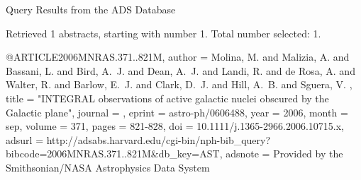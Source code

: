 Query Results from the ADS Database


Retrieved 1 abstracts, starting with number 1.  Total number selected: 1.

@ARTICLE{2006MNRAS.371..821M,
   author = {{Molina}, M. and {Malizia}, A. and {Bassani}, L. and {Bird}, A.~J. and 
	{Dean}, A.~J. and {Landi}, R. and {de Rosa}, A. and {Walter}, R. and 
	{Barlow}, E.~J. and {Clark}, D.~J. and {Hill}, A.~B. and {Sguera}, V.
	},
    title = "{INTEGRAL observations of active galactic nuclei obscured by the Galactic plane}",
  journal = {\mnras},
   eprint = {astro-ph/0606488},
     year = 2006,
    month = sep,
   volume = 371,
    pages = {821-828},
      doi = {10.1111/j.1365-2966.2006.10715.x},
   adsurl = {http://adsabs.harvard.edu/cgi-bin/nph-bib_query?bibcode=2006MNRAS.371..821M&db_key=AST},
  adsnote = {Provided by the Smithsonian/NASA Astrophysics Data System}
}


